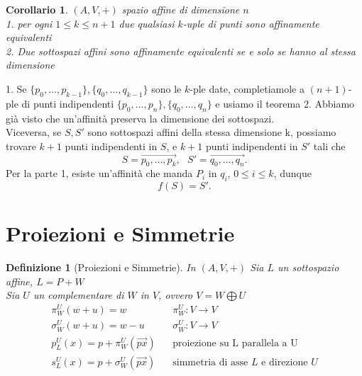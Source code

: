 \documentclass[12px]{article}
\theoremstyle{break}
\theoremstyle{break}
\theoremstyle{break}
\newtheorem{defin}{Definizione}
\theoremstyle{break}
\theoremstyle{break}
\newtheorem*{dimo}{Dimostrazione}
\theoremstyle{break}
\newtheorem*{corol}{Corollario}
\theoremstyle{break}
\newenvironment{dimo}
  {\begin{dimostrazione}}
  {\hfill\square\end{dimostrazione}}
\newenvironment{defi}
{\begin{mdframed}[linecolor=orange, backgroundcolor=orange!10]\begin{defin}}
  {\end{defin}\end{mdframed}}
\newenvironment{coro}
{\begin{mdframed}[linecolor=red, backgroundcolor=red!10]\begin{corol}}
  {\end{corol}\end{mdframed}}
\begin{document}
\begin{coro}
	$(A,V,+)$ spazio affine di dimensione $n$\\
	1. per ogni $1\leq k\leq n + 1$ due qualsiasi $k$-uple di punti sono affinamente equivalenti\\
	2. Due sottospazi affini sono affinamente equivalenti se e solo se hanno al stessa dimensione
\end{coro}
\begin{dimo}
	1. Se $\{p_0,\ldots,p_{k-1}\}, \{q_0,\ldots,q_{k - 1}\}$ sono le $k$-ple date, completiamole a $(n+1)$-ple di punti indipendenti $\{p_0,\ldots,p_n\}, \{q_0,\ldots,q_n\}$ e usiamo il teorema
	2. Abbiamo già visto che un'affinità preserva la dimensione dei sottospazi.\\
	Viceversa, se $S,S'$ sono sottospazi affini della stessa dimensione k, possiamo trovare $k+1$ punti indipendenti in $S$, e $k+1$ punti indipendenti in $S'$ tali che \[
	S = \overrightarrow{p_0,\ldots,p_k}, \ \ \ S'=\overrightarrow{q_0,\ldots,q_n}
	.\] 
	Per la parte 1, esiste un'affinità che manda $P_i$ in $q_i$, $0\leq i \leq k$, dunque \[
	f(S) = S'
	.\]
\end{dimo}
\newpage
\section{Proiezioni e Simmetrie}
\begin{defi}[Proiezioni e Simmetrie]
In $(A,V,+)$ Sia $L$ un sottospazio affine, $L = P+W$\\
Sia $U$ un complementare di $W$ in $V$, ovvero  $V = W\bigoplus U$
\begin{align*}
	\pi_W^U(w+u)=w \ \ \ \ \ \ \ \ \ \ \ & \pi_W^U:V \rightarrow V\\
	\sigma_W^U(w+u) = w - u \ \ \ \ \ & \sigma_W^U:V \rightarrow V \\
	p_L^U(x) = p+\pi_W^U(\overrightarrow{px}) \ \ \ \ &\text{proiezione su L parallela a U}\\
	s_L^U(x) = p+\sigma_W^U(\overrightarrow{px}) \ \ \ \ &\text{simmetria di asse $L$ e direzione $U$}
\end{align*}
\end{defi}
\end{document}
